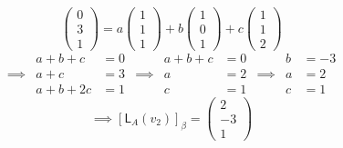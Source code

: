 \begin{enumerate}[(a)]
\begin{equation}
\begin{pmatrix}0\\3\\1\end{pmatrix}=
a\begin{pmatrix}1\\1\\1\end{pmatrix} +
b\begin{pmatrix}1\\0\\1\end{pmatrix} +
c\begin{pmatrix}1\\1\\2\end{pmatrix}
\end{equation}
\begin{align*}
& a+b+c &=0 & & a+b +c &=0 & & b &= -3\\
\implies& a +c &=3 &\implies& a &= 2 &\implies& a &=2\\
& a+b + 2c &= 1 & & c &=1 & &c &=1
\end{align*}
\begin{equation}
\implies \left[\mathsf{L}_A(v_2)\right]_\beta = \begin{pmatrix}2\\-3\\1\end{pmatrix}
\end{equation}


\end{enumerate}
